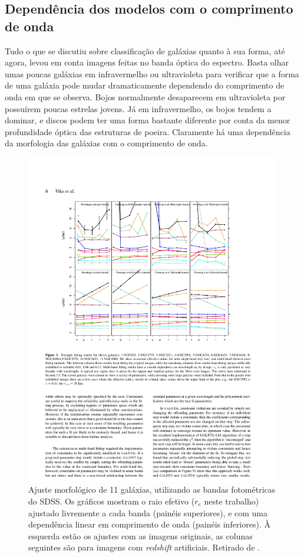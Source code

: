

\subsection{Dependência dos modelos com o comprimento de onda}
\label{sec:morph:comp:depLambda}

Tudo o que se discutiu sobre classificação de galáxias quanto à sua forma, até
agora, levou em conta imagens feitas no banda óptica do espectro. Basta olhar
umas poucas galáxias em infravermelho ou ultravioleta para verificar que a forma
de uma galáxia pode mudar dramaticamente dependendo do comprimento de onda em
que se observa. Bojos normalmente desaparecem em ultravioleta por possuírem
poucas estrelas jovens. Já em infravermelho, os bojos tendem a dominar, e discos
podem ter uma forma bastante diferente por conta da menor profundidade óptica
das estruturas de poeira. Claramente há uma dependência da morfologia das
galáxias com o comprimento de onda.

\begin{figure}
	\includegraphics[width=\textwidth]{figuras/vika-properties}
	\caption[Ajuste morfológico de bandas fotométricas] {Ajuste
	morfológico de 11 galáxias, utilizando as bandas fotométricas do
	SDSS. Os gráficos mostram o raio efetivo ($r_e$ neste trabalho) ajustado
	livremente a cada banda (painéis superiores), e com uma dependência linear em
	comprimento de onda (painéis inferiores). À esquerda estão os ajustes com as
	imagens originais, as colunas seguintes são para imagens com {\em redshift}
	artificiais. Retirado de \citet{Vika2013}.}
	\label{fig:propertiesVika}
\end{figure}

